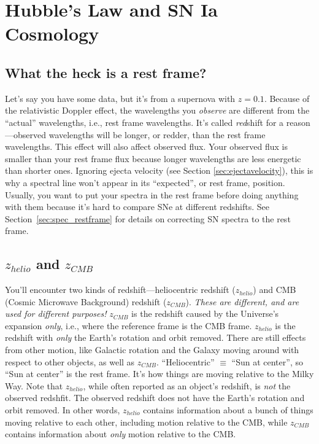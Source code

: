 \section{Hubble's Law and SN Ia Cosmology}

\subsection{What the heck is a rest frame?}

Let's say you have some data, but it's from a supernova with $z = 0.1$. Because of the relativistic Doppler effect, the wavelengths you \textit{observe} are different from the ``actual'' wavelengths, i.e., rest frame wavelengths. It's called \textit{red}shift for a reason---observed wavelengths will be longer, or redder, than the rest frame wavelengths. This effect will also affect observed flux. Your observed flux is smaller than your rest frame flux because longer wavelengths are less energetic than shorter ones. Ignoring ejecta velocity (see Section \ref{sec:ejectavelocity}), this is why a spectral line won't appear in its ``expected'', or rest frame, position. Usually, you want to put your spectra in the rest frame before doing anything with them because it's hard to compare SNe at different redshifts. See Section~\ref{sec:spec_restframe} for details on correcting SN spectra to the rest frame. 

\subsection{$z_{helio}$ and $z_{CMB}$}

You'll encounter two kinds of redshift---heliocentric redshift ($z_{helio}$) and CMB (Cosmic Microwave Background) redshift ($z_{CMB}$). \textit{These are different, and are used for different purposes!} $z_{CMB}$ is the redshift caused by the Universe's expansion \textit{only}, i.e., where the reference frame is the CMB frame. $z_{helio}$ is the redshift with \textit{only} the Earth's rotation and orbit removed. There are still effects from other motion, like Galactic rotation and the Galaxy moving around with respect to other objects, as well as $z_{CMB}$. ``Heliocentric'' $\equiv$ ``Sun at center'', so ``Sun at center'' is the rest frame. It's how things are moving relative to the Milky Way. Note that $z_{helio}$, while often reported as an object's redshift, is \textit{not} the observed redshfit. The observed redshift does not have the Earth's rotation and orbit removed. In other words, $z_{helio}$ contains information about a bunch of things moving relative to each other, including motion relative to the CMB, while $z_{CMB}$ contains information about \textit{only} motion relative to the CMB.

